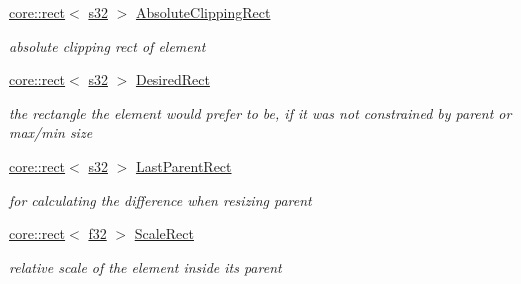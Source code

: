 \begin{DoxyCompactItemize}
\mbox{\label{classirr_1_1gui_1_1IGUIElement_a1000af90afbbe92344fb000f5af5c8fb}} 
\hyperlink{classirr_1_1core_1_1rect}{core\+::rect}$<$ \hyperlink{namespaceirr_ac66849b7a6ed16e30ebede579f9b47c6}{s32} $>$ \hyperlink{classirr_1_1gui_1_1IGUIElement_a1000af90afbbe92344fb000f5af5c8fb}{Absolute\+Clipping\+Rect}
\begin{DoxyCompactList}\small\item\em absolute clipping rect of element \end{DoxyCompactList}\item 
\mbox{\label{classirr_1_1gui_1_1IGUIElement_ad85b5d446a0dfb2fa46ee3753e664cd2}} 
\hyperlink{classirr_1_1core_1_1rect}{core\+::rect}$<$ \hyperlink{namespaceirr_ac66849b7a6ed16e30ebede579f9b47c6}{s32} $>$ \hyperlink{classirr_1_1gui_1_1IGUIElement_ad85b5d446a0dfb2fa46ee3753e664cd2}{Desired\+Rect}
\begin{DoxyCompactList}\small\item\em the rectangle the element would prefer to be, if it was not constrained by parent or max/min size \end{DoxyCompactList}\item 
\mbox{\label{classirr_1_1gui_1_1IGUIElement_a02f0934eefcc2191cfd665daf529ce0b}} 
\hyperlink{classirr_1_1core_1_1rect}{core\+::rect}$<$ \hyperlink{namespaceirr_ac66849b7a6ed16e30ebede579f9b47c6}{s32} $>$ \hyperlink{classirr_1_1gui_1_1IGUIElement_a02f0934eefcc2191cfd665daf529ce0b}{Last\+Parent\+Rect}
\begin{DoxyCompactList}\small\item\em for calculating the difference when resizing parent \end{DoxyCompactList}\item 
\mbox{\label{classirr_1_1gui_1_1IGUIElement_af8fc66b7504e9a073b02fc69a63f0b49}} 
\hyperlink{classirr_1_1core_1_1rect}{core\+::rect}$<$ \hyperlink{namespaceirr_a0277be98d67dc26ff93b1a6a1d086b07}{f32} $>$ \hyperlink{classirr_1_1gui_1_1IGUIElement_af8fc66b7504e9a073b02fc69a63f0b49}{Scale\+Rect}
\begin{DoxyCompactList}\small\item\em relative scale of the element inside its parent \end{DoxyCompactList}\item 

\end{DoxyCompactItemize}
